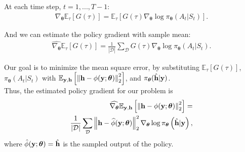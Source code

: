 \documentclass[journal,10pt,twocolumn]{IEEEtran}
\begin{document}
        At each time step, $t=1,...,T-1$:
        \begin{align*}
            \nabla_{\boldsymbol{\theta}}\mathbb{E}_{\tau}[G(\tau)]
                =\mathbb{E}_{\tau}\left[G(\tau)
                \nabla_{\boldsymbol{\theta}}\log{\pi_{\boldsymbol{\theta}}
                (A_t|S_t)}\right].
        \end{align*}

        And we can estimate the policy gradient with sample mean:
        \begin{align*}
            \widehat{\nabla_{\boldsymbol{\theta}}}\mathbb{E}_{\tau}[G(\tau)]
                =\frac{1}{\left| \mathcal{D}  \right|} \sum\limits_{\mathcal{D}}
                G(\tau)\nabla_{\boldsymbol{\theta}}\log{\pi_{\boldsymbol{\theta}}
                (A_t|S_t)}.
        \end{align*}

        Our goal is to minimize the mean square error, by substituting 
        $\mathbb{E}_{\tau}[G(\tau)]$, $\pi_{\boldsymbol{\theta}}(A_t|S_t)$ with 
        $\mathbb{E}_{{\bf y},{\bf h}}\left[\left\| {\bf h}-\phi(\mathbf{y};\boldsymbol{\theta}) \right\|^2_2 \right]$,
        and $\pi_{\boldsymbol{\theta}}(\hat{{\bf h}}|{\bf y})$.\\
        Thus, the estimated policy gradient for our problem is
        \begin{equation} \label{PG of comm}
        \begin{aligned}
            \widehat{\nabla_{\boldsymbol{\theta}}}
                    \mathbb{E}_{{\bf y},{\bf h}}\left[\left\| {\bf h}-\phi(\mathbf{y};\boldsymbol{\theta}) \right\|^2_2 \right]
                    = \\ \frac{1}{\left| \mathcal{D}  \right|} \sum\limits_{\mathcal{D}}
                    \left\| {\bf h}-\widehat{\phi}(\mathbf{y};\boldsymbol{\theta}) \right\|^2_2
                    \nabla_{\boldsymbol{\theta}}
                    \log \pi_{\boldsymbol{\theta}}
                    \left( \hat{{\bf h}}|{\bf y} \right),
        \end{aligned}
        \end{equation}
        where $\hat{\phi}(\mathbf{y};\boldsymbol{\theta}) = 
        \hat{{\bf h}}$ is the sampled output of the policy. 
\end{document}
